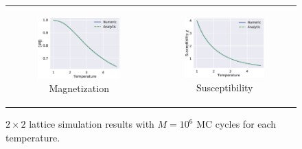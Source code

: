 \documentclass[aps,reprint]{revtex4-1}
\begin{document}
\begin{figure}
\begin{tabular}{cc}
\begin{subfigure}[b]{0.5\columnwidth}
      \includegraphics[width=\columnwidth]{figures/4bMagnetization.eps}
        \caption{Magnetization}
        \label{fix10}
    \end{subfigure}&
    \begin{subfigure}[b]{0.5\columnwidth}
        \includegraphics[width=\columnwidth]{figures/4bSusceptibility.eps}
        \caption{Susceptibility}
        \label{free10}
    \end{subfigure}\\
    \end{tabular}
    \caption{$2 \times 2$ lattice simulation results with $M = 10^6$ MC cycles
    for each temperature.}
    \label{fig:animals}
\end{figure}
\end{document}

